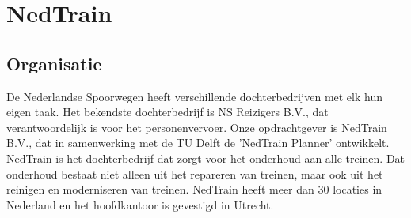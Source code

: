 \section{NedTrain}

\subsection{Organisatie}
De Nederlandse Spoorwegen heeft verschillende dochterbedrijven met elk hun eigen taak. Het bekendste dochterbedrijf is NS Reizigers B.V., dat verantwoordelijk is voor het personenvervoer. Onze opdrachtgever is NedTrain B.V., dat in samenwerking met de TU Delft de 'NedTrain Planner' ontwikkelt. NedTrain is het dochterbedrijf dat zorgt voor het onderhoud aan alle treinen. Dat onderhoud bestaat niet alleen uit het repareren van treinen, maar ook uit het reinigen en moderniseren van treinen. NedTrain heeft meer dan 30 locaties in Nederland en het hoofdkantoor is gevestigd in Utrecht. 